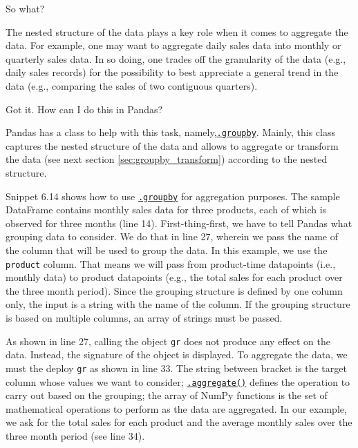 \documentclass[a4paper,11pt]{book}
\numberwithin{figure}{chapter}
\numberwithin{table}{chapter}
\newcommand{\question}[1]{%
    \begin{tcolorbox}[colback=comp_c!10,colframe=comp_c,sidebyside align=top,width=\linewidth,before skip=1ex]
        #1
    \end{tcolorbox}
    \switchcolumn%
}
\newcommand{\note}[1]{%
    \begin{tcolorbox}[colback=white!0,colframe=white!10,width=\linewidth,before skip=1ex]
        #1
    \end{tcolorbox}
}
\begin{document}
\begin{paracol}{2}
	\question{\raggedright So what?}
	\note{The nested structure of the data plays a key role when it comes to aggregate the data. For example, one may want to aggregate daily sales data into monthly or quarterly sales data. In so doing, one trades off the granularity of the data (e.g., daily sales records) for the possibility to best appreciate a general trend in the data (e.g., comparing the sales of two contiguous quarters).} 
\end{paracol}

\begin{paracol}{2}
	\question{\raggedright Got it. How can I do this in Pandas?}
	\note{Pandas has a class to help with this task, namely,\href{https://pandas.pydata.org/docs/reference/api/pandas.DataFrame.groupby.html#pandas.DataFrame.groupby}{\texttt{.groupby}}. Mainly, this class captures the nested structure of the data and allows to aggregate or transform the data (see next section \ref{sec:groupby_transform}) according to the nested structure.
	
	\quad Snippet 6.14 shows how to use \href{https://pandas.pydata.org/docs/reference/api/pandas.DataFrame.groupby.html#pandas.DataFrame.groupby}{\texttt{.groupby}} for aggregation purposes. The sample DataFrame contains monthly sales data for three products, each of which is observed for three months (line 14). First-thing-first, we have to tell Pandas what grouping data to consider. We do that in line 27, wherein we pass the name of the column that will be used to group the data. In this example, we use the \texttt{product} column. That means we will pass from product-time datapoints (i.e., monthly data) to product datapoints (e.g., the total sales for each product over the three month period). Since the grouping structure is defined by one column only, the input is a string with the name of the column. If the grouping structure is based on multiple columns, an array of strings must be passed.
	
	\quad As shown in line 27, calling the object \texttt{gr} does not produce any effect on the data. Instead, the signature of the object is displayed. To aggregate the data, we must the deploy \texttt{gr} as shown in line 33. The string between bracket is the target column whose values we want to consider; \href{https://pandas.pydata.org/docs/reference/api/pandas.core.groupby.DataFrameGroupBy.aggregate.html?highlight=aggregate#pandas.core.groupby.DataFrameGroupBy.aggregate}{\texttt{.aggregate()}} defines the operation to carry out based on the grouping; the array of NumPy functions is the set of mathematical operations to perform as the data are aggregated. In our example, we ask for the total sales for each product and the average monthly sales over the three month period (see line 34).
	}
\end{paracol}
\end{document}
